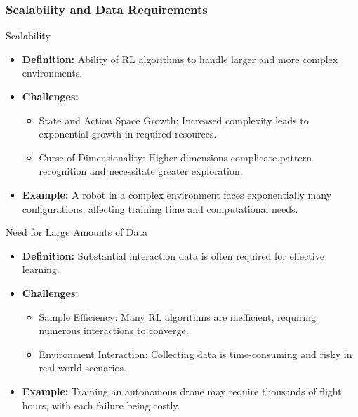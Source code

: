 \documentclass[aspectratio=169]{beamer}
\begin{document}
\begin{frame}[fragile]
    \frametitle{Scalability and Data Requirements}
    \begin{block}{Scalability}
        \begin{itemize}
            \item \textbf{Definition:} Ability of RL algorithms to handle larger and more complex environments.
            \item \textbf{Challenges:}
            \begin{itemize}
                \item State and Action Space Growth: Increased complexity leads to exponential growth in required resources.
                \item Curse of Dimensionality: Higher dimensions complicate pattern recognition and necessitate greater exploration.
            \end{itemize}
            \item \textbf{Example:} A robot in a complex environment faces exponentially many configurations, affecting training time and computational needs.
        \end{itemize}
    \end{block}
    
    \begin{block}{Need for Large Amounts of Data}
        \begin{itemize}
            \item \textbf{Definition:} Substantial interaction data is often required for effective learning.
            \item \textbf{Challenges:}
            \begin{itemize}
                \item Sample Efficiency: Many RL algorithms are inefficient, requiring numerous interactions to converge.
                \item Environment Interaction: Collecting data is time-consuming and risky in real-world scenarios.
            \end{itemize}
            \item \textbf{Example:} Training an autonomous drone may require thousands of flight hours, with each failure being costly.
        \end{itemize}
    \end{block}
\end{frame}
\end{document}
